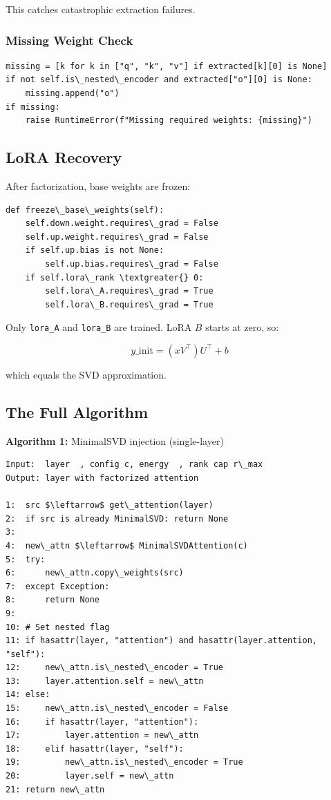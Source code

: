 This catches catastrophic extraction failures.

\subsubsection{Missing Weight Check}

\begin{lstlisting}
missing = [k for k in ["q", "k", "v"] if extracted[k][0] is None]
if not self.is\_nested\_encoder and extracted["o"][0] is None:
    missing.append("o")
if missing:
    raise RuntimeError(f"Missing required weights: {missing}")
\end{lstlisting}

\subsection{LoRA Recovery}

After factorization, base weights are frozen:

\begin{lstlisting}
def freeze\_base\_weights(self):
    self.down.weight.requires\_grad = False
    self.up.weight.requires\_grad = False
    if self.up.bias is not None:
        self.up.bias.requires\_grad = False
    if self.lora\_rank \textgreater{} 0:
        self.lora\_A.requires\_grad = True
        self.lora\_B.requires\_grad = True
\end{lstlisting}

Only \texttt{lora\_A} and \texttt{lora\_B} are trained. LoRA $B$ starts at zero, so:

\[
y\_{\text{init}} = (x V^\top) U^\top + b
\tag{4.8}
\]

which equals the SVD approximation.

\subsection{The Full Algorithm}

\textbf{Algorithm 1:} MinimalSVD injection (single-layer)
\begin{lstlisting}
Input:  layer  , config c, energy  , rank cap r\_max
Output: layer with factorized attention

1:  src $\leftarrow$ get\_attention(layer)
2:  if src is already MinimalSVD: return None
3:
4:  new\_attn $\leftarrow$ MinimalSVDAttention(c)
5:  try:
6:      new\_attn.copy\_weights(src)
7:  except Exception:
8:      return None
9:
10: # Set nested flag
11: if hasattr(layer, "attention") and hasattr(layer.attention, "self"):
12:     new\_attn.is\_nested\_encoder = True
13:     layer.attention.self = new\_attn
14: else:
15:     new\_attn.is\_nested\_encoder = False
16:     if hasattr(layer, "attention"):
17:         layer.attention = new\_attn
18:     elif hasattr(layer, "self"):
19:         new\_attn.is\_nested\_encoder = True
20:         layer.self = new\_attn
21: return new\_attn
\end{lstlisting}

